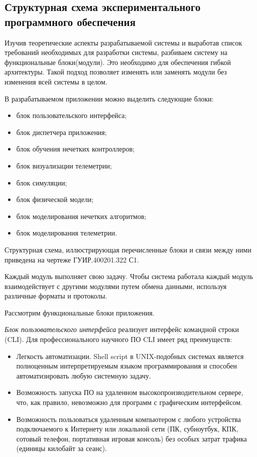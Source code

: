 \subsection{Структурная схема экспериментального программного обеспечения}
\label{sub:sys:4}

Изучив теоретические аспекты разрабатываемой системы и выработав список требований необходимых для разработки системы, разбиваем систему на функциональные блоки(модули). Это необходимо для обеспечения гибкой архитектуры. Такой подход позволяет изменять или заменять модули без изменения всей системы в целом.

В разрабатываемом приложении можно выделить следующие блоки:

\begin{itemize}
  \item блок пользовательского интерфейса;
  \item блок диспетчера приложения;
  \item блок обучения нечетких контроллеров;
  \item блок визуализации телеметрии;
  \item блок симуляции;
  \item блок физической модели;
  \item блок моделирования нечетких алгоритмов;
  \item блок моделирования телеметрии.
\end{itemize}

Структурная схема, иллюстрирующая перечисленные блоки и связи между ними приведена на чертеже ГУИР.400201.322 С1.

Каждый модуль выполняет свою задачу. Чтобы система работала каждый модуль взаимодействует с другими модулями путем обмена данными, используя различные форматы и протоколы.

Рассмотрим функциональные блоки приложения.

\textit{Блок пользовательского интерфейса} реализует интерфейс командной строки (CLI). Для профессионального научного ПО CLI имеет ряд преимуществ:

\begin{itemize}
  \item Легкость автоматизации. Shell script в UNIX-подобных системах является полноценным интерпретируемым языком программирования и способен автоматизировать любую системную задачу.
  \item Возможность запуска ПО на удаленном высокопроизводительном сервере, что, как правило, невозможно для программ с графическим интерфейсом.
  \item Возможность пользоваться удаленным компьютером с любого устройства подключаемого к Интернету или локальной сети (ПК, субноутбук, КПК, сотовый телефон, портативная игровая консоль) без особых затрат трафика (единицы килобайт за сеанс).
\end{itemize}


